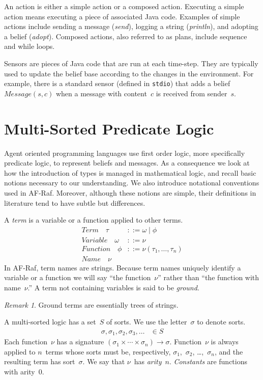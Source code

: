 \documentclass[preprint]{sigplanconf} %
\theoremstyle{remark}
\newtheorem{remark}{Remark}
\begin{document}
An action is either a simple action or a composed action. Executing a
simple action means executing a piece of associated Java code. Examples of
simple actions include sending a message (\textit{send}), logging a string
(\textit{println}), and adopting a belief (\textit{adopt}).  Composed
actions, also referred to as plans, include sequence and while loops.

Sensors are pieces of Java code that are run at each time-step. They are
typically used to update the belief base according to the changes in the
environment. For example, there is a standard sensor (defined in
\texttt{stdio}) that adds a belief $\mathit{Message}(s,c)$ when a message
with content~$c$ is received from sender~$s$.

\section{Multi-Sorted Predicate Logic} \label{sec:multi-sorted} %

Agent oriented programming languages use first order logic, more
specifically predicate logic, to represent beliefs and messages. As a
consequence we look at how the introduction of types is managed in
mathematical logic, and recall basic notions necessary to our
understanding. We also introduce notational conventions used in AF-Raf.
Moreover, although these notions are simple, their definitions in
literature tend to have subtle but differences.

A \emph{term} is a variable or a function applied to other terms.
\begin{align}
\mathit{Term}\quad\tau &::= \omega \mid \phi \\
\mathit{Variable}\quad\omega &::= \nu \\
\mathit{Function}\quad\phi &::= \nu(\tau_1,\ldots,\tau_n) \\
\mathit{Name}\quad\nu
\end{align}
In AF-Raf, term names are strings.  Because term names uniquely identify a
variable or a function we will say ``the function~$\nu$'' rather than ``the
function with name~$\nu$.'' A term not containing variables is said to be
\emph{ground}.

\begin{remark}
Ground terms are essentially trees of strings.
\end{remark}

A multi-sorted logic has a set~$S$ of sorts.  We use the letter~$\sigma$ to
denote sorts.
\begin{align}
\sigma, \sigma_1, \sigma_2, \sigma_3, \ldots &\in S
\end{align}
Each function~$\nu$ has a signature
$(\sigma_1\times\cdots\times\sigma_n)\to\sigma$.  Function~$\nu$ is always
applied to $n$~terms whose sorts must be, respectively,
$\sigma_1$,~$\sigma_2$, \dots,~$\sigma_n$, and the resulting term has
sort~$\sigma$. We say that $\nu$~has \emph{arity}~$n$. \emph{Constants} are
functions with arity~$0$.
\end{document}
